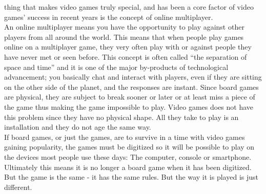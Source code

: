    thing that makes video games truly special, and has been a core factor
   of video games’ success in recent years is the concept of online
    multiplayer.\newline
\\
An online multiplayer means you have the opportunity to play against other
players from all around the world. This means that when people play games
online on a multiplayer game, they very often play with or against people
they have never met or seen before. This concept is often called
“the separation of space and time” and it is one of the major by-products
 of technological advancement; you basically chat and interact with players,
  even if they are sitting on the other side of the planet, and the responses
   are instant.
Since board games are physical, they are subject to break sooner or later or
at least miss a piece of the game thus making the game impossible to play.
 Video games does not have this problem since they have no physical shape.
 All they take to play is an installation and they do not age the same
 way. \newline
\\
If board games, or just the games, are to survive in a time with video games
gaining popularity, the games must be digitized so it will be possible to play
 on the devices most people use these days: The computer, console or
 smartphone. \newline
\\
Ultimately this means it is no longer a board game when it has been digitized.
 But the game is the same - it has the same rules. But the way it is played is
  just different.\newline
